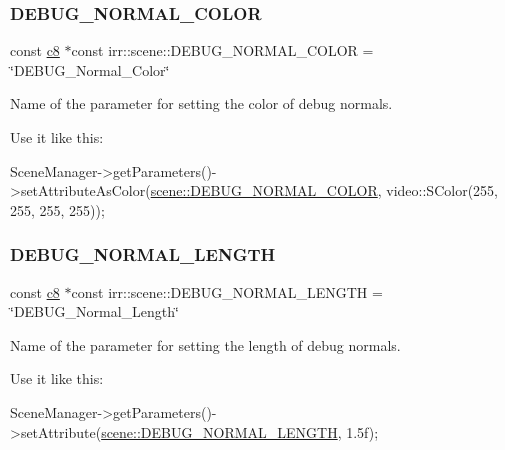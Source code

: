 \subsubsection{\texorpdfstring{D\+E\+B\+U\+G\+\_\+\+N\+O\+R\+M\+A\+L\+\_\+\+C\+O\+L\+OR}{DEBUG\_NORMAL\_COLOR}}
{\footnotesize\ttfamily const \hyperlink{namespaceirr_a9395eaea339bcb546b319e9c96bf7410}{c8} $\ast$const irr\+::scene\+::\+D\+E\+B\+U\+G\+\_\+\+N\+O\+R\+M\+A\+L\+\_\+\+C\+O\+L\+OR = \char`\"{}D\+E\+B\+U\+G\+\_\+\+Normal\+\_\+\+Color\char`\"{}}



Name of the parameter for setting the color of debug normals. 

Use it like this\+: 
\begin{DoxyCode}
SceneManager->getParameters()->setAttributeAsColor(\hyperlink{namespaceirr_1_1scene_a6e821825be0878c0f51491a664fa4bb9}{scene::DEBUG\_NORMAL\_COLOR}, 
      video::SColor(255, 255, 255, 255));
\end{DoxyCode}
 \mbox{\label{namespaceirr_1_1scene_ab40d5d1c49b0ac71f026f360dcf70343}} 
\subsubsection{\texorpdfstring{D\+E\+B\+U\+G\+\_\+\+N\+O\+R\+M\+A\+L\+\_\+\+L\+E\+N\+G\+TH}{DEBUG\_NORMAL\_LENGTH}}
{\footnotesize\ttfamily const \hyperlink{namespaceirr_a9395eaea339bcb546b319e9c96bf7410}{c8} $\ast$const irr\+::scene\+::\+D\+E\+B\+U\+G\+\_\+\+N\+O\+R\+M\+A\+L\+\_\+\+L\+E\+N\+G\+TH = \char`\"{}D\+E\+B\+U\+G\+\_\+\+Normal\+\_\+\+Length\char`\"{}}



Name of the parameter for setting the length of debug normals. 

Use it like this\+: 
\begin{DoxyCode}
SceneManager->getParameters()->setAttribute(\hyperlink{namespaceirr_1_1scene_ab40d5d1c49b0ac71f026f360dcf70343}{scene::DEBUG\_NORMAL\_LENGTH}, 1.5f);
\end{DoxyCode}
 \mbox{\label{namespaceirr_1_1scene_a21e42b7847ca0eed258b80aac458b7dd}} 
